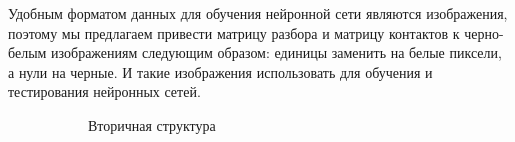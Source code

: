 \documentclass[14pt]{matmex-diploma-custom}
\begin{document}
Удобным форматом данных для обучения нейронной сети являются изображения, поэтому мы предлагаем привести матрицу разбора и матрицу контактов к черно-белым изображениям следующим образом: единицы заменить на белые пиксели, а нули на черные. И такие изображения использовать для обучения и тестирования нейронных сетей.

\begin{figure}[h]
\centering
\begin{subfigure}{.3\textwidth}
  \centering
  \caption{Вторичная структура}
  \label{struc_a}
\end{subfigure}%
\begin{subfigure}{.3\textwidth}
  \centering

\end{subfigure}
\end{figure}
\end{document}
